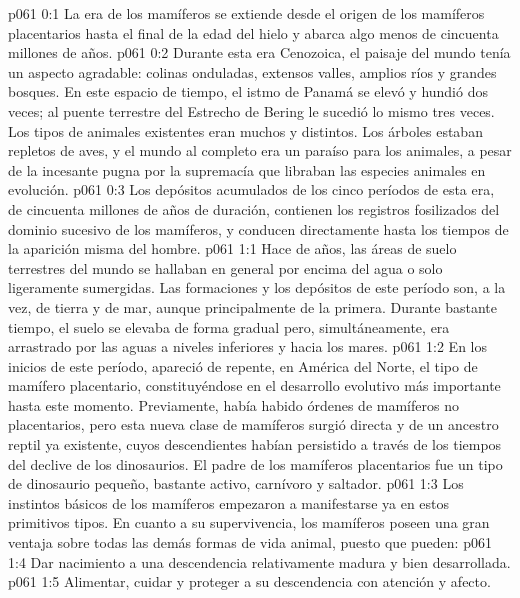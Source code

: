 \author{Portador de vida}
\vs p061 0:1 La era de los mamíferos se extiende desde el origen de los mamíferos placentarios hasta el final de la edad del hielo y abarca algo menos de cincuenta millones de años.
\vs p061 0:2 Durante esta era Cenozoica, el paisaje del mundo tenía un aspecto agradable: colinas onduladas, extensos valles, amplios ríos y grandes bosques. En este espacio de tiempo, el istmo de Panamá se elevó y hundió dos veces; al puente terrestre del Estrecho de Bering le sucedió lo mismo tres veces. Los tipos de animales existentes eran muchos y distintos. Los árboles estaban repletos de aves, y el mundo al completo era un paraíso para los animales, a pesar de la incesante pugna por la supremacía que libraban las especies animales en evolución.
\vs p061 0:3 Los depósitos acumulados de los cinco períodos de esta era, de cincuenta millones de años de duración, contienen los registros fosilizados del dominio sucesivo de los mamíferos, y conducen directamente hasta los tiempos de la aparición misma del hombre.
\vs p061 1:1 Hace de años, las áreas de suelo terrestres del mundo se hallaban en general por encima del agua o solo ligeramente sumergidas. Las formaciones y los depósitos de este período son, a la vez, de tierra y de mar, aunque principalmente de la primera. Durante bastante tiempo, el suelo se elevaba de forma gradual pero, simultáneamente, era arrastrado por las aguas a niveles inferiores y hacia los mares.
\vs p061 1:2 En los inicios de este período, apareció de repente, en América del Norte, el tipo de mamífero placentario, constituyéndose en el desarrollo evolutivo más importante hasta este momento. Previamente, había habido órdenes de mamíferos no placentarios, pero esta nueva clase de mamíferos surgió directa y  de un ancestro reptil ya existente, cuyos descendientes habían persistido a través de los tiempos del declive de los dinosaurios. El padre de los mamíferos placentarios fue un tipo de dinosaurio pequeño, bastante activo, carnívoro y saltador.
\vs p061 1:3 Los instintos básicos de los mamíferos empezaron a manifestarse ya en estos primitivos tipos. En cuanto a su supervivencia, los mamíferos poseen una gran ventaja sobre todas las demás formas de vida animal, puesto que pueden:
\vs p061 1:4 Dar nacimiento a una descendencia relativamente madura y bien desarrollada.
\vs p061 1:5 Alimentar, cuidar y proteger a su descendencia con atención y afecto.
